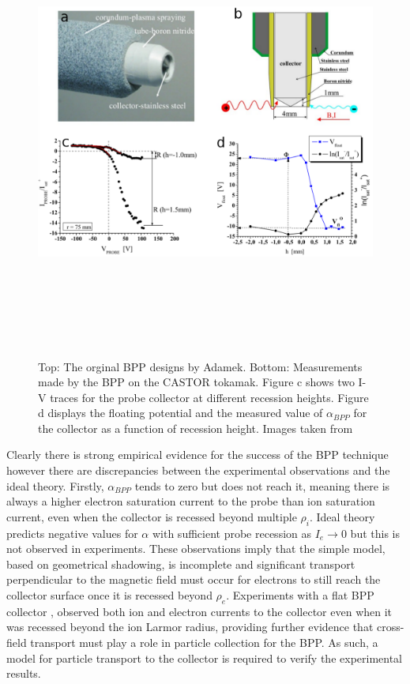 \begin{figure}[H]
\centering
\includegraphics[height=15cm, width = 15cm]{adamek_orig_results}
\caption{Top: The orginal BPP designs by Adamek. Bottom: Measurements made by the BPP on the CASTOR tokamak. Figure c shows two I-V traces for the probe collector at different recession heights. Figure d displays the floating potential and the measured value of $\alpha_{BPP}$ for the collector as a function of recession height. Images taken from \cite{BPP} } %
\label{fig:adamek}
\end{figure}

Clearly there is strong empirical evidence for the success of the BPP technique however there are discrepancies between the experimental observations and the ideal theory. Firstly, $\alpha_{BPP}$ tends to zero but does not reach it, meaning there is always a higher electron saturation current to the probe than ion saturation current, even when the collector is recessed beyond multiple $\rho_i$. Ideal theory predicts negative values for $\alpha$ with sufficient probe recession as $I_e \to 0$ but this is not observed in experiments. These observations imply that the simple model, based on geometrical shadowing, is incomplete and significant transport perpendicular to the magnetic field must occur for electrons to still reach the collector surface once it is recessed beyond $\rho_e$.  Experiments with a flat BPP collector \cite{BPP_flat}, observed both ion and electron currents to the collector even when it was recessed beyond the ion Larmor radius, providing further evidence that cross-field transport must play a role in particle collection for the BPP. As such, a model for particle transport to the collector is required to verify the experimental results.

